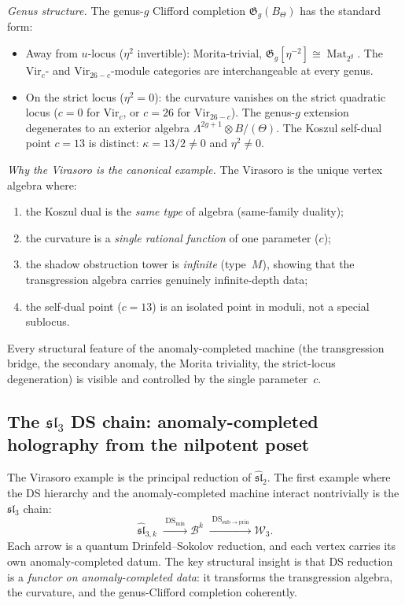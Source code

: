 \begin{computation}
\emph{Genus structure.}
The genus-$g$ Clifford completion
$\mathfrak G_g(B_\Theta)$ has the standard form:
\begin{itemize}
\item Away from $u$-locus ($\eta^2$ invertible):
 Morita-trivial, $\mathfrak G_g[\eta^{-2}]\cong
 \operatorname{Mat}_{2^g}$. The $\mathrm{Vir}_c$- and
 $\mathrm{Vir}_{26-c}$-module categories are
 interchangeable at every genus.
\item On the strict locus ($\eta^2=0$):
 the curvature vanishes on the strict quadratic locus
 ($c=0$ for $\mathrm{Vir}_c$, or $c=26$ for
 $\mathrm{Vir}_{26-c}$).
 The genus-$g$ extension degenerates to an exterior algebra
 $\Lambda^{2g+1}\otimes B/(\Theta)$.
 The Koszul self-dual point $c=13$ is distinct:
 $\kappa = 13/2 \neq 0$ and $\eta^2 \neq 0$.
\end{itemize}

\emph{Why the Virasoro is the canonical example.}
The Virasoro is the unique vertex algebra where:
\begin{enumerate}[label=\textup{(\arabic*)}]
\item the Koszul dual is the \emph{same type} of algebra
 (same-family duality);
\item the curvature is a \emph{single rational function}
 of one parameter ($c$);
\item the shadow obstruction tower is \emph{infinite} (type~$M$),
 showing that the transgression algebra carries genuinely
 infinite-depth data;
\item the self-dual point ($c=13$) is an isolated point in
 moduli, not a special sublocus.
\end{enumerate}
Every structural feature of the anomaly-completed machine (the
transgression bridge, the secondary anomaly, the Morita
triviality, the strict-locus degeneration) is visible and
controlled by the single parameter~$c$.
\end{computation}

\subsection{The $\mathfrak{sl}_3$ DS chain:
anomaly-completed holography from the nilpotent poset}

The Virasoro example is the principal reduction of
$\widehat{\mathfrak{sl}}_2$. The first example where the
DS hierarchy and the anomaly-completed machine interact
nontrivially is the $\mathfrak{sl}_3$ chain:
\[
\widehat{\mathfrak{sl}}_{3,k}
\;\xrightarrow{\;\mathrm{DS}_{\min}\;}
\mathcal B^k
\;\xrightarrow{\;\mathrm{DS}_{\mathrm{sub}\to\mathrm{prin}}\;}
\mathcal W_3.
\]
Each arrow is a quantum Drinfeld--Sokolov reduction, and each
vertex carries its own anomaly-completed datum. The key
structural insight is that DS reduction is a \emph{functor on
anomaly-completed data}: it transforms the transgression
algebra, the curvature, and the genus-Clifford completion
coherently.


